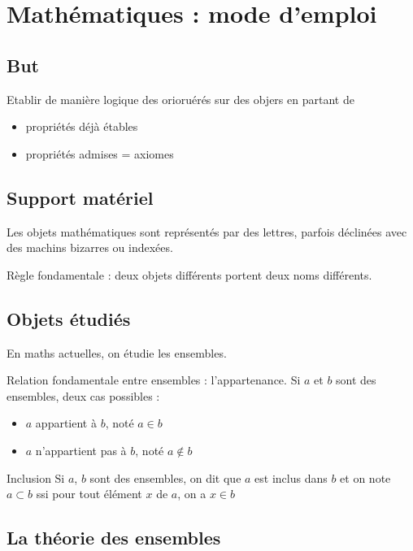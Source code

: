 \documentclass{prepacours}
\begin{document}

\pagedegarde

\section{Mathématiques : mode d'emploi}
\subsection{But}

Etablir de manière logique des orioruérés sur des objers en partant de 
\begin{itemize}
    \item propriétés déjà étables
    \item propriétés admises = axiomes
\end{itemize}

\subsection{Support matériel}

Les objets mathématiques sont représentés par des lettres, parfois déclinées avec des 
machins bizarres ou indexées. 

Règle fondamentale : deux objets différents portent deux noms différents. 

\subsection{Objets étudiés}

En maths actuelles, on étudie les ensembles. 

Relation fondamentale entre ensembles : l'appartenance. Si $a$ et $b$ sont des 
ensembles, deux cas possibles : 

\begin{itemize}
    \item $a$ appartient à $b$, noté $a \in b$
    \item $a$ n'appartient pas à $b$, noté $a \notin b$
\end{itemize}

\begin{definition}{Inclusion}{}
    Si $a$, $b$ sont des ensembles, on dit que $a$ est inclus dans $b$ et on note 
    $a \subset b$ ssi pour tout élément $x$ de $a$, on a $x \in b$
\end{definition}

\subsection{La théorie des ensembles}
\end{document}

